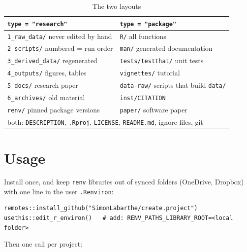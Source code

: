 \documentclass[11pt,a4paper]{article}
\begin{document}
\begin{table}[htbp]
    \centering
    \small
    \caption{The two layouts}
    \label{tab:layouts}
    \begin{tabular}{ll}
        \toprule
        \texttt{type = "research"}                    & \texttt{type = "package"}                        \\
        \midrule
        \texttt{1\_raw\_data/} never edited by hand   & \texttt{R/} all functions                         \\
        \texttt{2\_scripts/} numbered = run order     & \texttt{man/} generated documentation             \\
        \texttt{3\_derived\_data/} regenerated        & \texttt{tests/testthat/} unit tests               \\
        \texttt{4\_outputs/} figures, tables          & \texttt{vignettes/} tutorial                      \\
        \texttt{5\_docs/} research paper              & \texttt{data-raw/} scripts that build \texttt{data/} \\
        \texttt{6\_archives/} old material            & \texttt{inst/CITATION}                            \\
        \texttt{renv/} pinned package versions        & \texttt{paper/} software paper                    \\
        \midrule
        \multicolumn{2}{l}{both: \texttt{DESCRIPTION}, \texttt{.Rproj}, \texttt{LICENSE}, \texttt{README.md}, ignore files, git} \\
        \bottomrule
    \end{tabular}
\end{table}

\section{Usage}\label{sec:usage}

Install once, and keep \texttt{renv} libraries out of synced folders (OneDrive, Dropbox) with one line in the user \texttt{.Renviron}:

\begin{lstlisting}
remotes::install_github("SimonLabarthe/create.project")
usethis::edit_r_environ()   # add: RENV_PATHS_LIBRARY_ROOT=<local folder>
\end{lstlisting}

Then one call per project:
\end{document}
